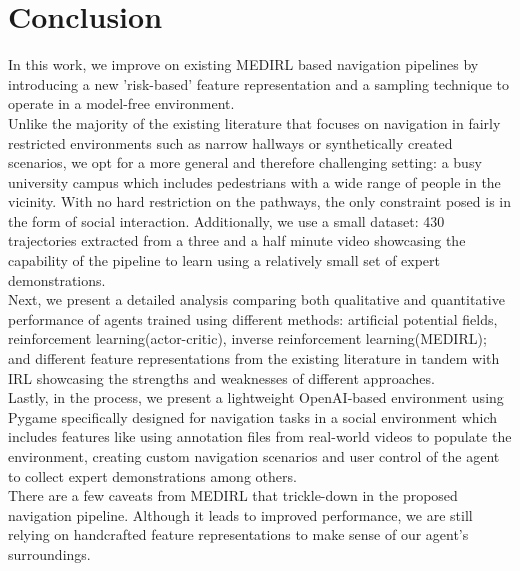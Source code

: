 \label{ch:conclusion}
\section{Conclusion}
In this work, we improve on existing MEDIRL based navigation pipelines by introducing a new 'risk-based' feature representation and a sampling technique to operate in a model-free environment. \\
Unlike the majority of the existing literature that focuses on navigation in fairly restricted environments such as narrow hallways or synthetically created scenarios, we opt for a more general and therefore challenging setting: a busy university campus which includes pedestrians with a wide range of people in the vicinity. With no hard restriction on the pathways, the only constraint posed is in the form of social interaction. Additionally, we use a small dataset: 430 trajectories extracted from a three and a half minute video showcasing the capability of the pipeline to learn using a relatively small set of expert demonstrations.\\
Next, we present a detailed analysis comparing both qualitative and quantitative performance of agents trained using different methods: artificial potential fields, reinforcement learning(actor-critic), inverse reinforcement learning(MEDIRL); and different feature representations from the existing literature in tandem with IRL showcasing the strengths and weaknesses of different approaches.\\
Lastly, in the process, we present a lightweight OpenAI-based environment using Pygame specifically designed for navigation tasks in a social environment which includes features like using annotation files from real-world videos to populate the environment, creating custom navigation scenarios and user control of the agent to collect expert demonstrations among others. \\
There are a few caveats from MEDIRL that trickle-down in the proposed navigation pipeline. Although it leads to improved performance, we are still relying on handcrafted feature representations to make sense of our agent's surroundings. \\

